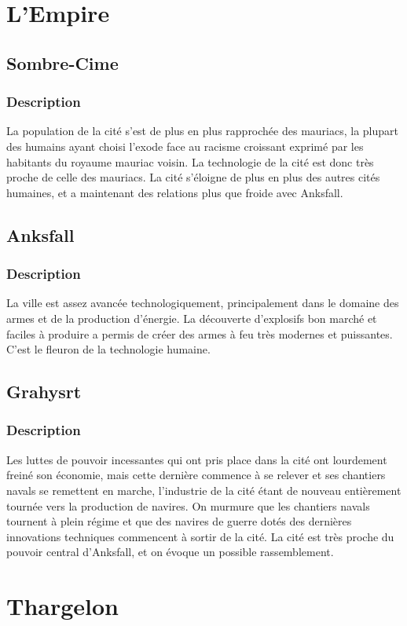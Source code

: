 \section{L'Empire}
\subsection{Sombre-Cime}
\subsubsection{Description}
La population de la cité s'est de plus en plus rapprochée des mauriacs, la plupart des humains ayant choisi l'exode face au racisme croissant exprimé par les habitants du royaume mauriac voisin. La technologie de la cité est donc très proche de celle des mauriacs. La cité s'éloigne de plus en plus des autres cités humaines, et a maintenant des relations plus que froide avec Anksfall.
\subsection{Anksfall}
\subsubsection{Description}
La ville est assez avancée technologiquement, principalement dans le domaine des armes et de la production d'énergie. La découverte d'explosifs bon marché et faciles à produire a permis de créer des armes à feu très modernes et puissantes. C'est le fleuron de la technologie humaine.
\subsection{Grahysrt}
\subsubsection{Description}
Les luttes de pouvoir incessantes qui ont pris place dans la cité ont lourdement freiné son économie, mais cette dernière commence à se relever et ses chantiers navals se remettent en marche, l'industrie de la cité étant de nouveau entièrement tournée vers la production de navires. On murmure que les chantiers navals tournent à plein régime et que des navires de guerre dotés des dernières innovations techniques commencent à sortir de la cité. La cité est très proche du pouvoir central d'Anksfall, et on évoque un possible rassemblement.
\section{Thargelon}
